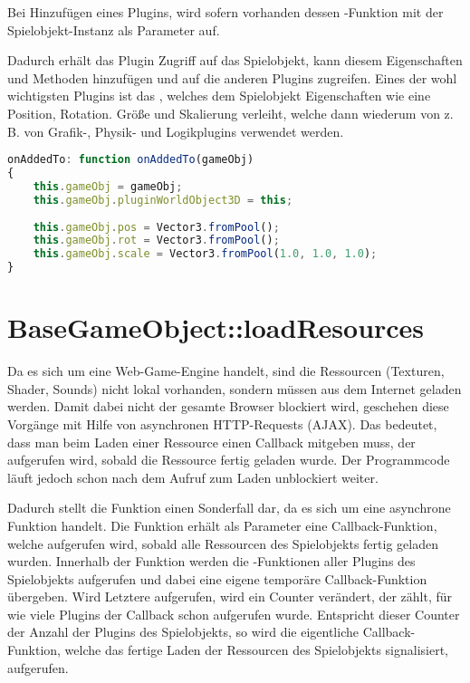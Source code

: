 Bei Hinzufügen eines Plugins, wird sofern vorhanden dessen -Funktion mit der Spielobjekt-Instanz als Parameter auf.

Dadurch erhält das Plugin Zugriff auf das Spielobjekt, kann diesem Eigenschaften und Methoden hinzufügen und auf die anderen Plugins zugreifen. Eines der wohl wichtigsten Plugins ist das , welches dem Spielobjekt Eigenschaften wie eine Position, Rotation. Größe und Skalierung verleiht, welche dann wiederum von z. B. von Grafik-, Physik- und Logikplugins verwendet werden.

\begin{lstlisting}[language=JavaScript]
onAddedTo: function onAddedTo(gameObj)
{
	this.gameObj = gameObj;
	this.gameObj.pluginWorldObject3D = this;
	
	this.gameObj.pos = Vector3.fromPool();
	this.gameObj.rot = Vector3.fromPool();
	this.gameObj.scale = Vector3.fromPool(1.0, 1.0, 1.0);
}
\end{lstlisting}

\section{BaseGameObject::loadResources}

Da es sich um eine Web-Game-Engine handelt, sind die Ressourcen (Texturen, Shader, Sounds) nicht lokal vorhanden, sondern müssen aus dem Internet geladen werden. Damit dabei nicht der gesamte Browser blockiert wird, geschehen diese Vorgänge mit Hilfe von asynchronen HTTP-Requests (AJAX). Das bedeutet, dass man beim Laden einer Ressource einen Callback mitgeben muss, der aufgerufen wird, sobald die Ressource fertig geladen wurde. Der Programmcode läuft jedoch schon nach dem Aufruf zum Laden unblockiert weiter.

Dadurch stellt die Funktion  einen Sonderfall dar, da es sich um eine asynchrone Funktion handelt. Die Funktion erhält als Parameter eine Callback-Funktion, welche aufgerufen wird, sobald alle Ressourcen des Spielobjekts fertig geladen wurden. Innerhalb der Funktion werden die -Funktionen aller Plugins des Spielobjekts aufgerufen und dabei eine eigene temporäre Callback-Funktion übergeben. Wird Letztere aufgerufen, wird ein Counter verändert, der zählt, für wie viele Plugins der Callback schon aufgerufen wurde. Entspricht dieser Counter der Anzahl der Plugins des Spielobjekts, so wird die eigentliche Callback-Funktion, welche das fertige Laden der Ressourcen des Spielobjekts signalisiert, aufgerufen.

